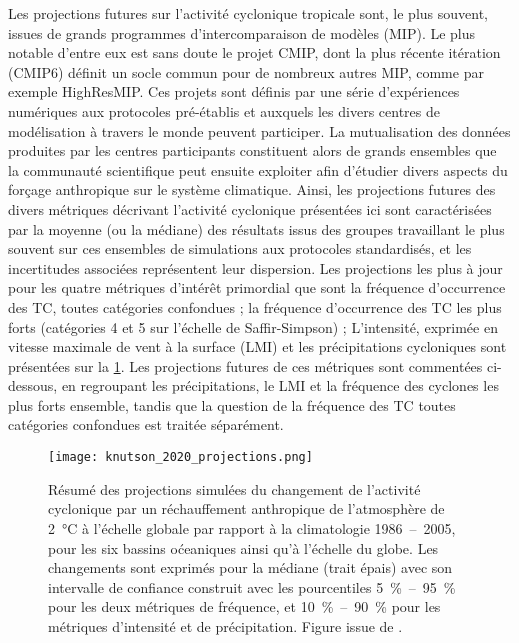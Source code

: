 \documentclass[../main.tex]{subfiles}
\begin{document}
Les projections futures sur l'activité cyclonique tropicale sont, le plus souvent, issues de grands programmes d'intercomparaison de modèles (MIP). Le plus
notable d'entre eux est sans doute le projet CMIP, dont la plus récente itération (CMIP6) définit un socle commun pour de nombreux autres MIP, comme par exemple
HighResMIP. Ces projets sont définis par une série d'expériences numériques aux protocoles pré-établis et auxquels les divers centres de modélisation à travers
le monde peuvent participer. La mutualisation des données produites par les centres participants constituent alors de grands ensembles que la communauté
scientifique peut ensuite exploiter afin d'étudier divers aspects du forçage anthropique sur le système climatique. Ainsi, les projections futures des divers
métriques décrivant l'activité cyclonique présentées ici sont caractérisées par la moyenne (ou la médiane) des résultats issus des groupes travaillant le plus
souvent sur ces ensembles de simulations aux protocoles standardisés, et les incertitudes associées représentent leur dispersion. Les projections les plus à
jour pour les quatre métriques d'intérêt primordial que sont la fréquence d'occurrence des TC, toutes catégories confondues ; la fréquence d'occurrence des TC
les plus forts (catégories 4 et 5 sur l'échelle de Saffir-Simpson) ; L'intensité, exprimée en vitesse maximale de vent à la surface (LMI) et les précipitations
cycloniques sont présentées sur la \cref{fig:projections_TC}. Les projections futures de ces métriques sont commentées ci-dessous, en regroupant les
précipitations, le LMI et la fréquence des cyclones les plus forts ensemble, tandis que la question de la fréquence des TC toutes catégories confondues est
traitée séparément.
%
\begin{figure}[tb]
    \centering
    \texttt{[image: knutson\_2020\_projections.png]}
    \caption{Résumé des projections simulées du changement de l'activité cyclonique par un réchauffement anthropique de l'atmosphère de \SI{2}{\degreeCelsius} à
        l'échelle globale par rapport à la climatologie \num{1986}~--~\num{2005}, pour les six bassins oćeaniques ainsi qu'à l'échelle du globe. Les changements
        sont exprimés pour la médiane (trait épais) avec son intervalle de confiance construit avec les pourcentiles \SI{5}{\percent}~--~\SI{95}{\percent} pour
        les deux métriques de fréquence, et \SI{10}{\percent}~--~\SI{90}{\percent} pour les métriques d'intensité et de précipitation. Figure issue de
        \cite{knutson_tropical_2020}.}
    \label{fig:projections_TC}
\end{figure}
\end{document}
